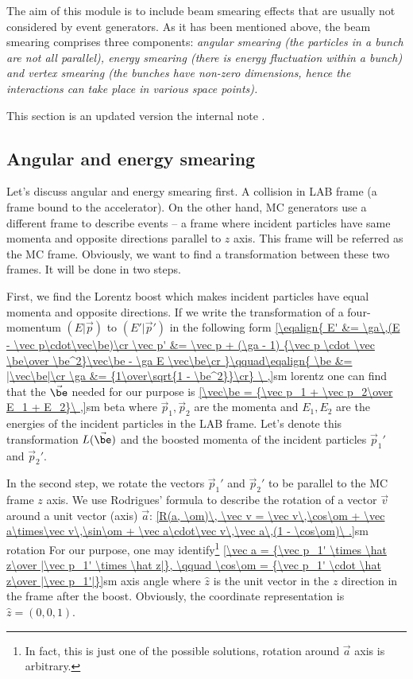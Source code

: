 The aim of this module is to include beam smearing effects that are usually not considered by event generators. As it has been mentioned above, the beam smearing comprises three components: \em{angular smearing} (the particles in a bunch are not all parallel), \em{energy smearing} (there is energy fluctuation within a bunch) and \em{vertex smearing} (the bunches have non-zero dimensions, hence the interactions can take place in various space points).

This section is an updated version the internal note .


\subsection{Angular and energy smearing}

Let's discuss angular and energy smearing first. A collision in LAB frame (a frame bound to the accelerator). On the other hand, MC generators use a different frame to describe events -- a frame where incident particles have same momenta and opposite directions parallel to $z$ axis. This frame will be referred as the MC frame. Obviously, we want to find a transformation between these two frames. It will be done in two steps. 

First, we find the Lorentz boost which makes incident particles have equal momenta and opposite directions. If we write the transformation of a four-momentum $(E|\vec p)$ to $(E'|\vec p')$ in the following form
\eqref{\eqalign{
E'      &= \ga\,(E - \vec p\cdot\vec\be)\cr
\vec p' &= \vec p  +  (\ga - 1) {\vec p \cdot \vec \be\over \be^2}\vec\be - \ga E \vec\be\cr
}\qquad\eqalign{
\be &= |\vec\be|\cr
\ga &= {1\over\sqrt{1 - \be^2}}\cr}
\ ,}{sm lorentz}
one can find that the $\vec\be$ needed for our purpose is
\eqref{\vec\be = {\vec p_1 + \vec p_2\over E_1 + E_2}\ ,}{sm beta}
where $\vec p_1, \vec p_2$ are the momenta and $E_1, E_2$ are the energies of the incident particles in the LAB frame. Let's denote this transformation $L(\vec\be)$ and the boosted momenta of the incident particles $\vec p_1'$ and $\vec p_2'$.

In the second step, we rotate the vectors $\vec p_1'$ and $\vec p_2'$ to be parallel to the MC frame $z$ axis. We use Rodrigues' formula to describe the rotation of a vector $\vec v$ around a unit vector (axis) $\vec a$:
\eqref{R(a, \om)\, \vec v = \vec v\,\cos\om + \vec a\times\vec v\,\sin\om + \vec a\cdot\vec v\,\vec a\,(1 - \cos\om)\ .}{sm rotation}
For our purpose, one may identify\footnote{In fact, this is just one of the possible solutions, rotation around $\vec a$ axis is arbitrary.}
\eqref{\vec a = {\vec p_1' \times \hat z\over |\vec p_1' \times \hat z|}, \qquad \cos\om = {\vec p_1' \cdot \hat z\over |\vec p_1'|}}{sm axis angle}
where $\hat z$ is the unit vector in the $z$ direction in the frame after the boost. Obviously, the coordinate representation is $\hat z = (0, 0, 1)$.

